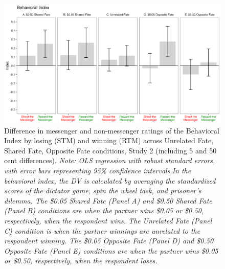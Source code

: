 \renewcommand{\baselinestretch}{1.25}%
\begin{figure}[!t]%
  \centering
  \includegraphics[width=1.0\textwidth]{figures/study2_main_fivecent_behavior_all.png}
  \caption{Difference in messenger and non-messenger ratings of the Behavioral Index by losing (STM) and winning (RTM) across Unrelated Fate, Shared Fate, Opposite Fate conditions, Study 2 (including 5 and 50 cent differences). 
  \textit{Note: OLS regression with robust standard errors, with error bars representing 95\% confidence intervals.In the behavioral index, the DV is calculated by averaging the standardized scores of the dictator game, spin the wheel task, and prisoner's dilemma. The \$0.05 Shared Fate (Panel A) and \$0.50 Shared Fate (Panel B) conditions are when the partner wins \$0.05 or \$0.50, respectively, when the respondent wins. The Unrelated Fate (Panel C) condition is when the partner winnings are unrelated to the respondent winning. The \$0.05 Opposite Fate (Panel D) and \$0.50 Opposite Fate (Panel E) conditions are when the partner wins \$0.05 or \$0.50, respectively, when the respondent loses.}}
  \label{fig:study2_main_fivecent_behavior_all}
\end{figure}%
\renewcommand{\baselinestretch}{1.67}%
